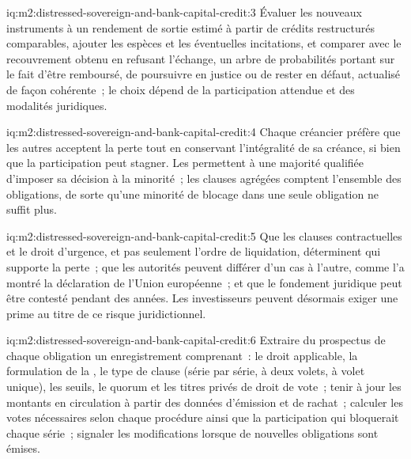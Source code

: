 \begin{solution}{iq:m2:distressed-sovereign-and-bank-capital-credit:3}
Évaluer les nouveaux instruments à un rendement de sortie estimé à partir de crédits restructurés comparables,
ajouter les espèces et les éventuelles incitations, et comparer avec le recouvrement obtenu en refusant l'échange,
un arbre de probabilités portant sur le fait d'être remboursé, de poursuivre en justice ou de rester en défaut, actualisé
de façon cohérente~; le choix dépend de la participation attendue et des modalités juridiques.
\end{solution}

\begin{solution}{iq:m2:distressed-sovereign-and-bank-capital-credit:4}
Chaque créancier préfère que les autres acceptent la perte tout en conservant l'intégralité de sa créance, si bien que
la participation peut stagner. Les  permettent à une majorité qualifiée d'imposer sa décision
à la minorité~; les clauses agrégées comptent l'ensemble des obligations, de sorte qu'une minorité de blocage dans une
seule obligation ne suffit plus.
\end{solution}

\begin{solution}{iq:m2:distressed-sovereign-and-bank-capital-credit:5}
Que les clauses contractuelles et le droit d'urgence, et pas seulement l'ordre de liquidation, déterminent qui
supporte la perte~; que les autorités peuvent différer d'un cas à l'autre, comme l'a montré la déclaration
de l'Union européenne~; et que le fondement juridique peut être contesté pendant des années. Les investisseurs peuvent
désormais exiger une prime au titre de ce risque juridictionnel.
\end{solution}

\begin{solution}{iq:m2:distressed-sovereign-and-bank-capital-credit:6}
Extraire du prospectus de chaque obligation un enregistrement comprenant~: le droit applicable, la formulation de la , le type de clause (série par série, à deux volets, à volet unique), les seuils, le quorum et les titres privés
de droit de vote~; tenir à jour les montants en circulation à partir des données d'émission et de rachat~; calculer les
votes nécessaires selon chaque procédure ainsi que la participation qui bloquerait chaque série~;
signaler les modifications lorsque de nouvelles obligations sont émises.
\end{solution}
